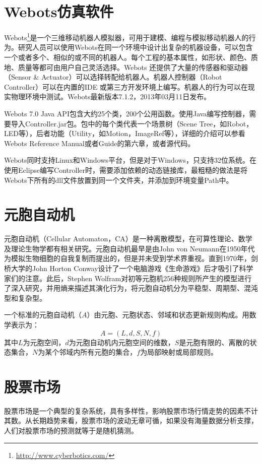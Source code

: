 \section{Webots仿真软件}
Webots\footnote{\url{http://www.cyberbotics.com/}}是一个三维移动机器人模拟器，可用于建模、编程与模拟移动机器人的行为。研究人员可以使用Webots在同一个环境中设计出复杂的机器设备，可以包含一个或者多个、相似的或不同的机器人。每个工程的基本属性，如形状、颜色、质地、质量等都可由用户自己灵活选择。Webots 还提供了大量的传感器和驱动器（Sensor \& Actuator）可以选择转配给机器人。机器人控制器（Robot Controller）可以在内置的IDE 或第三方开发环境上编写。机器人的行为可以在现实物理环境中测试。Webots最新版本7.1.2，2013年03月11日发布。

Webots 7.0 Java API包含大约25个类，200个公用函数。使用Java编写控制器，需要导入Controller.jar包。包中的每个类代表一个场景树（Scene Tree，如Robot，LED等），后者功能（Utility，如Motion，ImageRef等），详细的介绍可以参看Webots Reference Manual或者Guide的第六章，或者源代码。

Webots同时支持Linux和Windows平台，但是对于Windows，只支持32位系统。在使用Eclipse编写Controller时，需要添加依赖的动态链接库，最粗糙的做法是将Webots下所有的dll文件放置到同一个文件夹，并添加到环境变量Path中。

\section{元胞自动机}
元胞自动机（Cellular Automaton，CA）是一种离散模型，在可算性理论、数学及理论生物学都有相关研究。元胞自动机最早是由John von Neumann在1950年代为模拟生物细胞的自我复制而提出的，但是并未受到学术界重视。直到1970年，剑桥大学的John Horton Conway设计了一个电脑游戏《生命游戏》后才吸引了科学家们的注意。此后，Stephen Wolfram对初等元胞机256种规则所产生的模型进行了深入研究，并用熵来描述其演化行为，将元胞自动机分为平稳型、周期型、混沌型和复杂型。

一个标准的元胞自动机（$A$）由元胞、元胞状态、邻域和状态更新规则构成。用数学表示为：
\begin{equation}\label{eq:ca}
  A = (L, d, S, N, f)
\end{equation}
其中$L$为元胞空间，$d$为元胞自动机内元胞空间的维数，$S$是元胞有限的、离散的状态集合，$N$为某个邻域内所有元胞的集合，$f$为局部映射或局部规则。

\section{股票市场}
股票市场是一个典型的复杂系统，具有多样性，影响股票市场行情走势的因素不计其数。从长期趋势来看，股票市场的波动无章可循，如果没有海量数据分析支撑，人们对股票市场的预测就等于是随机猜测。


